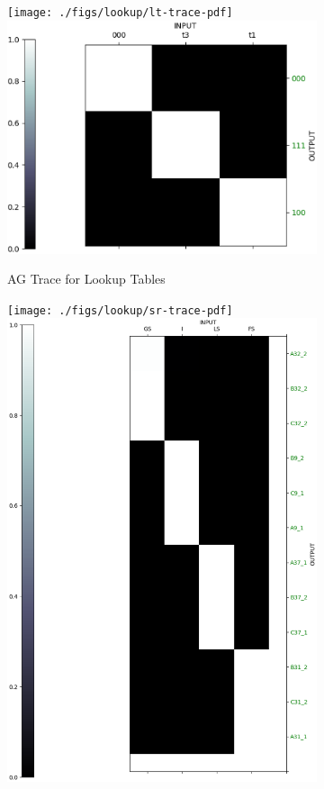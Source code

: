 \begin{figure}[ht] 
	\begin{subfigure}[b]{0.5\linewidth}
		\centering
		\ifpdf
		\texttt{[image: ./figs/lookup/lt-trace-pdf]}
		\else
		\includegraphics[width=0.95\linewidth]{./figs/lookup/lt-trace-eps}
		\fi
		\caption{AG Trace for Lookup Tables} 
		\label{ag_lt} 
		\vspace{2ex}
	\end{subfigure}%
	\begin{subfigure}[b]{0.5\linewidth}
		\centering
		\ifpdf
		\texttt{[image: ./figs/lookup/sr-trace-pdf]}
		\else
		\includegraphics[width=0.95\linewidth]{./figs/lookup/sr-trace-eps}

\end{subfigure}
\end{figure}
